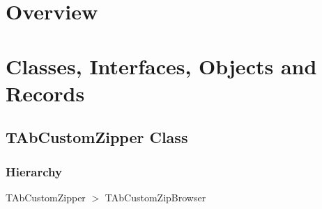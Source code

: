 \documentclass{report}
\newif\ifpdf
\begin{document}
\section{Overview}
\begin{description}
\item[\texttt{\begin{ttfamily}TAbCustomZipper\end{ttfamily} Class}]
\item[\texttt{\begin{ttfamily}TAbZipper\end{ttfamily} Class}]
\end{description}
\section{Classes, Interfaces, Objects and Records}
\ifpdf
\subsection*{\large{\textbf{TAbCustomZipper Class}}\normalsize\hspace{1ex}\hrulefill}
\else
\subsection*{TAbCustomZipper Class}
\fi
\label{AbZipper.TAbCustomZipper}
\subsubsection*{\large{\textbf{Hierarchy}}\normalsize\hspace{1ex}\hfill}
TAbCustomZipper {$>$} TAbCustomZipBrowser
\end{document}
